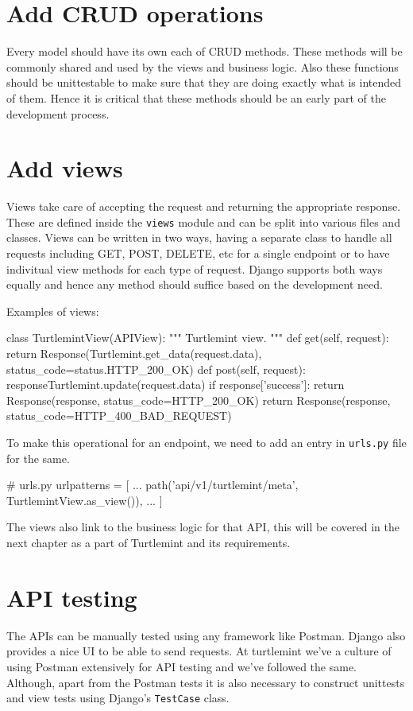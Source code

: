 \section{Add CRUD operations}
Every model should have its own each of CRUD methods. These methods will be
commonly shared and used by the views and business logic. Also these functions
should be unittestable to make sure that they are doing exactly what is
intended of them. Hence it is critical that these methods should be an early
part of the development process.

\section{Add views}
Views take care of accepting the request and returning the appropriate
response. These are defined inside the \texttt{views} module and can be split
into various files and classes. Views can be written in two ways, having a
separate class to handle all requests including GET, POST, DELETE, etc for a
single endpoint or to have indivitual view methods for each type of request.
Django supports both ways equally and hence any method should suffice based
on the development need.

Examples of views:
\begin{pythoncode}
class TurtlemintView(APIView):
    """
    Turtlemint view.
    """
    def get(self, request):
        return Response(Turtlemint.get_data(request.data),
                        status_code=status.HTTP_200_OK)
    def post(self, request):
        responseTurtlemint.update(request.data)
        if response['success']:
            return Response(response, status_code=HTTP_200_OK)
        return Response(response, status_code=HTTP_400_BAD_REQUEST)
\end{pythoncode}

To make this operational for an endpoint, we need to add an entry in
\texttt{urls.py} file for the same.

\begin{pythoncode}
# urls.py
urlpatterns = [
    ...
    path('api/v1/turtlemint/meta', TurtlemintView.as_view()),
    ...
]
\end{pythoncode}

The views also link to the business logic for that API, this will be covered
in the next chapter as a part of Turtlemint and its requirements.

\section{API testing}
The APIs can be manually tested using any framework like Postman. Django also
provides a nice UI to be able to send requests. At turtlemint we've a culture
of using Postman extensively for API testing and we've followed the same.
Although, apart from the Postman tests it is also necessary to construct
unittests and view tests using Django's \texttt{TestCase} class.

